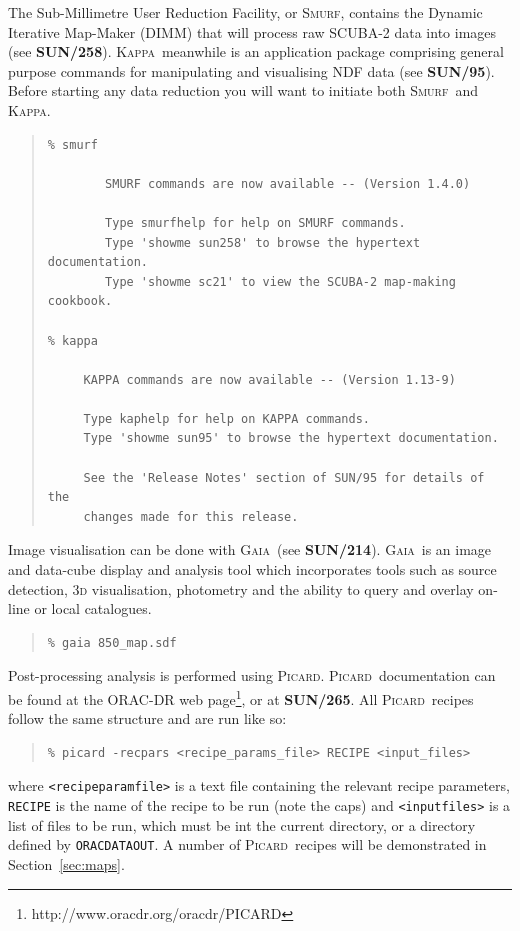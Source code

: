 \documentclass[twoside,11pt]{article}
\newcommand{\htmladdnormallinkfoot}[2]{#1\footnote{#2}}
\newcommand{\xref}[3]{#1}
\renewcommand{\_}{\texttt{\symbol{95}}}
\newenvironment{myquote}{\begin{quote}\begin{small}}{\end{small}\end{quote}}
\newcommand{\gaia}{\xref{\textsc{Gaia}}{sun214}{}}
\newcommand{\Kappa}{\xref{\textsc{Kappa}}{sun95}{}}
\newcommand{\picard}{\xref{\textsc{Picard}}{sun265}{}}
\newcommand{\smurf}{\xref{\textsc{Smurf}}{sun258}{}}
\newcommand{\param}[1]{\texttt{#1}}
\newcommand{\gaiasun}{\xref{\textbf{SUN/214}}{sun214}{}}
\newcommand{\kappasun}{\xref{\textbf{SUN/95}}{sun95}{}}
\newcommand{\picardsun}{\xref{\textbf{SUN/265}}{sun265}{}}
\newcommand{\smurfsun}{\xref{\textbf{SUN/258}}{sun258}{}}
\begin{document}
The Sub-Millimetre User Reduction Facility, or \textsc{Smurf}, contains the
Dynamic Iterative Map-Maker (DIMM) that will process raw SCUBA-2 data
into images (see \smurfsun). \Kappa\ meanwhile is an application
package comprising general purpose commands for manipulating and
visualising NDF data (see \kappasun). Before starting any data
reduction you will want to initiate both \smurf\ and \Kappa.
\begin{myquote}
\begin{verbatim}
% smurf

        SMURF commands are now available -- (Version 1.4.0)

        Type smurfhelp for help on SMURF commands.
        Type 'showme sun258' to browse the hypertext documentation.
        Type 'showme sc21' to view the SCUBA-2 map-making cookbook.

% kappa

     KAPPA commands are now available -- (Version 1.13-9)

     Type kaphelp for help on KAPPA commands.
     Type 'showme sun95' to browse the hypertext documentation.

     See the 'Release Notes' section of SUN/95 for details of the
     changes made for this release.
\end{verbatim}
\end{myquote}
Image visualisation can be done with \gaia\ (see \gaiasun). \gaia\ is an
image and data-cube display and analysis tool which incorporates tools such
as source detection, 3\textsc{d} visualisation, photometry and the ability
to query and overlay on-line or local catalogues.
\begin{myquote}
\begin{verbatim}
% gaia 850_map.sdf
\end{verbatim}
\end{myquote}

Post-processing analysis is performed using \picard. \picard\ documentation can be
found at \htmladdnormallinkfoot{the ORAC-DR web page}{http://www.oracdr.org/oracdr/PICARD},
or at \picardsun. All \picard\ recipes follow the same structure and are run like so:
\begin{myquote}
\begin{verbatim}
% picard -recpars <recipe_params_file> RECIPE <input_files>
\end{verbatim}
\end{myquote}
where \param{<recipe\_param\_file>} is a text file containing the
relevant recipe parameters, \param{RECIPE} is the name of the recipe
to be run (note the caps) and \param{<input\_files>} is a list of
files to be run, which must be int the current directory, or a
directory defined by \param{ORAC\_DATA\_OUT}. A number of \picard\
recipes will be demonstrated in Section~\ref{sec:maps}.
\end{document}
